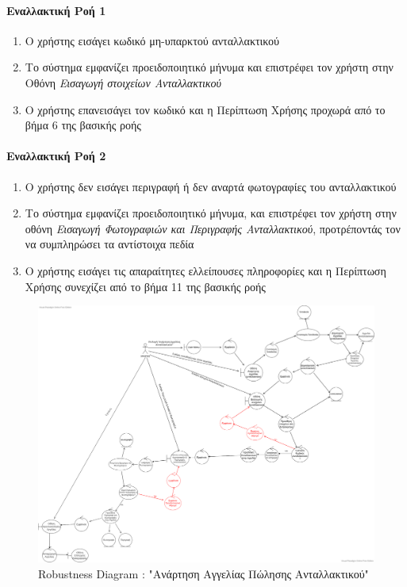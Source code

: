 \documentclass{../ol-softwaremanual}
\begin{document}
	
	\paragraph{Εναλλακτική Ροή 1}
	
	\begin{enumerate}
		\item Ο χρήστης εισάγει κωδικό μη-υπαρκτού ανταλλακτικού
		\item Το σύστημα εμφανίζει προειδοποιητικό μήνυμα και επιστρέφει τον χρήστη στην Οθόνη \textit{Εισαγωγή στοιχείων Ανταλλακτικού}
		\item Ο χρήστης επανεισάγει τον κωδικό και η Περίπτωση Χρήσης προχωρά από το βήμα 6 της βασικής ροής
	\end{enumerate}
	
	\paragraph{Εναλλακτική Ροή 2}
	
	\begin{enumerate}
		\item Ο χρήστης δεν εισάγει περιγραφή ή δεν αναρτά φωτογραφίες του ανταλλακτικού
		\item Το σύστημα εμφανίζει προειδοποιητικό μήνυμα, και επιστρέφει τον χρήστη στην οθόνη \textit{Εισαγωγή Φωτογραφιών και Περιγραφής Ανταλλακτικού}, προτρέποντάς τον να συμπληρώσει τα αντίστοιχα πεδία
		\item Ο χρήστης εισάγει τις απαραίτητες ελλείπουσες πληροφορίες και η Περίπτωση Χρήσης συνεχίζει από το βήμα 11 της βασικής ροής
	\end{enumerate}
	
	\begin{figure}[htbp!]
		\includegraphics[scale=0.245]{img/rob_spare_part_listing.png}
		\caption{\en Robustness Diagram : "\gr Ανάρτηση Αγγελίας Πώλησης Ανταλλακτικού\en"\gr}
	\end{figure}
	
\end{document}
